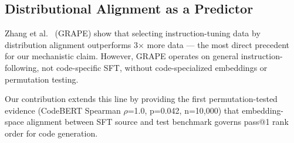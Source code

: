 \subsection{Distributional Alignment as a Predictor}

Zhang et al.\ \cite{Zhang2025GRAPE} (GRAPE) show that selecting instruction-tuning data by distribution
alignment outperforms 3$\times$ more data --- the most direct precedent for our mechanistic claim.
However, GRAPE operates on general instruction-following, not code-specific SFT, without
code-specialized embeddings or permutation testing.

Our contribution extends this line by providing the first permutation-tested evidence
(CodeBERT Spearman $\rho$=1.0, p=0.042, n=10,000) that embedding-space alignment between SFT
source and test benchmark governs pass@1 rank order for code generation.
